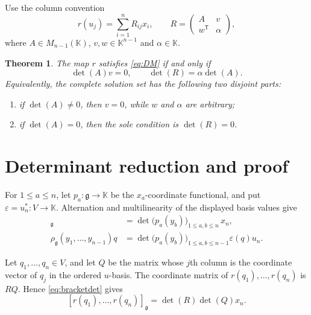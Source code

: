 \documentclass[11pt]{article}
\newtheorem{theorem}{Theorem}
\newcommand{\K}{\mathbb K}
\begin{document}
Use the column convention
\[
 r(u_j)=\sum_{i=1}^n R_{ij}x_i,
 \qquad
 R=\begin{pmatrix}A&v\\ w^{\mathsf T}&\alpha\end{pmatrix},
\]
where $A\in M_{n-1}(\K)$, $v,w\in\K^{n-1}$ and $\alpha\in\K$.

\begin{theorem}\label{thm:classification}
The map $r$ satisfies \eqref{eq:DM} if and only if
\begin{equation}\label{eq:criterion}
 \det(A)v=0,
 \qquad
 \det(R)=\alpha\det(A).
\end{equation}
Equivalently, the complete solution set has the following two disjoint
parts:
\begin{enumerate}
 \item if $\det(A)\ne0$, then $v=0$, while $w$ and $\alpha$ are arbitrary;
 \item if $\det(A)=0$, then the sole condition is $\det(R)=0$.
\end{enumerate}
\end{theorem}

\section{Determinant reduction and proof}

For $1\leq a\leq n$, let
$p_a\colon\mathfrak g\to\K$ be the $x_a$-coordinate functional, and put
$\varepsilon=u_n^*\colon V\to\K$.  Alternation and multilinearity of the
displayed basis values give
\begin{align}
 [y_1,\ldots,y_n]_{\mathfrak g}
 &=\det\bigl(p_a(y_b)\bigr)_{1\leq a,b\leq n}\,x_n,
 \label{eq:bracketdet}\\
 \rho_{\mathfrak g}(y_1,\ldots,y_{n-1})q
 &=\det\bigl(p_a(y_b)\bigr)_{1\leq a,b\leq n-1}
   \varepsilon(q)u_n.
 \label{eq:actiondet}
\end{align}

Let $q_1,\ldots,q_n\in V$, and let $Q$ be the matrix whose $j$th column
is the coordinate vector of $q_j$ in the ordered $u$-basis.  The coordinate
matrix of $r(q_1),\ldots,r(q_n)$ is $RQ$.  Hence \eqref{eq:bracketdet}
gives
\begin{equation}\label{eq:G}
 [r(q_1),\ldots,r(q_n)]_{\mathfrak g}
 =\det(R)\det(Q)x_n.
\end{equation}
\end{document}
